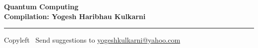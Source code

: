 
\graphicspath{{images/}}
% 
% 
% 
% 

% 
%


\footnotesize


\begin{center}
\Large{\textbf{Quantum Computing\\ Compilation: Yogesh Haribhau Kulkarni}}  
\end{center}

\begin{multicols}{2}

\end{multicols}

\rule{\linewidth}{0.25pt}
\scriptsize
Copyleft \textcopyleft\  Send suggestions to 
\href{http://www.yogeshkulkarni.com}{yogeshkulkarni@yahoo.com}


